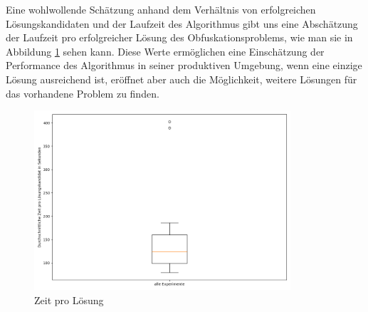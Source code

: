 Eine wohlwollende Schätzung anhand dem Verhältnis von erfolgreichen Lösungskandidaten und der Laufzeit des Algorithmus gibt uns eine Abschätzung der Laufzeit pro erfolgreicher Lösung des Obfuskationsproblems, wie man sie in Abbildung \ref{fig:time_per_evasion} sehen kann. Diese Werte ermöglichen eine Einschätzung der Performance des Algorithmus in seiner produktiven Umgebung, wenn eine einzige Lösung ausreichend ist, eröffnet aber auch die Möglichkeit, weitere Lösungen für das vorhandene Problem zu finden.
\begin{figure}[h]
    \centering
    \includegraphics[width=0.85\textwidth]{gfx/Hypothesendiagramme/time_per_evasion.png}
    \caption{Zeit pro Lösung}
    \label{fig:time_per_evasion}
\end{figure}